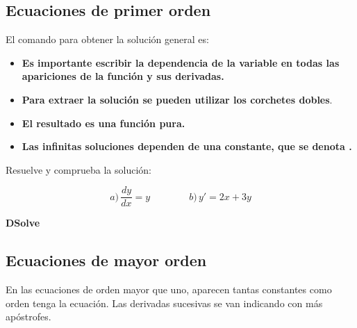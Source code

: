 \documentclass[a4paper,10pt, draft]{article}
\newcommand{\com}[1]{\textbf{\color{blue}{#1}}}
\newenvironment{ejer}{\begin{tcolorbox}[center title, title=Ejercicios,
fonttitle=\sffamily\bfseries,colback=blue!5,colframe=orange]}{\end{tcolorbox}}
\newenvironment{funciones}{\begin{tcolorbox}[center title, title=Nuevas funciones, fonttitle=\sffamily\bfseries, colback=green!5!white,colframe=red!75!black]}{\end{tcolorbox}\bigskip}
\begin{document}
\newpage


\subsection{Ecuaciones de primer orden}

El comando para obtener la solución general es:
\begin{center}
\com{DSolve[ecuación, y,x]}
\end{center}

\begin{itemize}

\item \textbf{Es importante escribir la dependencia de la variable en todas las apariciones de la función y sus derivadas.}

\item \textbf{Para extraer la solución se pueden utilizar  los corchetes dobles}.

\item \textbf{El resultado es una \guillemotleft función pura\guillemotright.} 

\item \textbf{Las infinitas soluciones dependen de una constante, que se denota \com{C[1]}.}


\end{itemize}



\begin{ejer}

Resuelve y comprueba la solución:

$$
a) \,\frac{dy}{dx}=y   \qquad \qquad b) \,y'= 2x+3y
$$


\end{ejer}

\enlargethispage{1 cm}

\begin{funciones}

\textbf{DSolve}

\end{funciones}

\newpage


\subsection{Ecuaciones de mayor orden}

En las ecuaciones de orden mayor que uno, aparecen tantas constantes como orden tenga la ecuación. Las derivadas sucesivas se van indicando con más apóstrofes.
\end{document}
